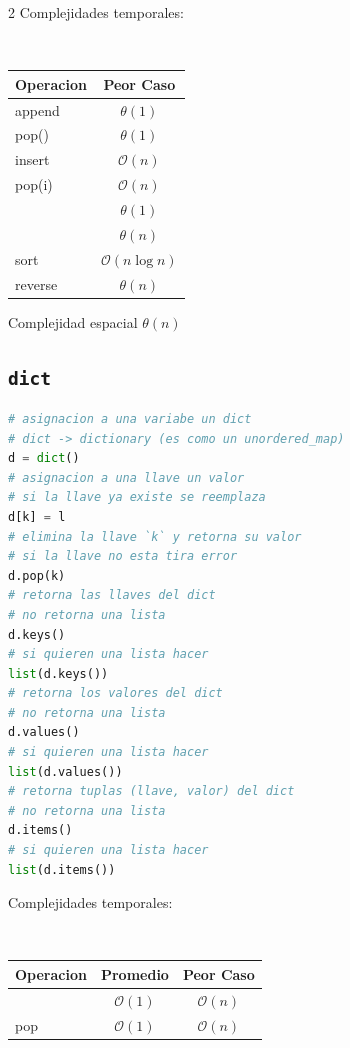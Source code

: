 \documentclass{article}
\newcommand{\bigO}{\mathcal{O}}
\begin{document}
\begin{multicols}{2}
Complejidades temporales:
\begin{table}[H]
  \tt \scriptsize
  \begin{center}
    \begin{tabular}[c]{l|c}
      \hline
      Operacion & Peor Caso \\
      \hline
      append & $\theta(1)$ \\
      \hline
      pop() & $\theta(1)$ \\
      \hline
      insert & $\bigO(n)$ \\
      \hline
      pop(i) & $\bigO(n)$ \\
      \hline
      [i] & $\theta(1)$\\
      \hline
      [i:j] & $\theta(n)$\\
      \hline
      sort & $\bigO(n \log n)$ \\
      \hline
      reverse & $\theta(n)$\\
    \end{tabular}
  \end{center}
\end{table}

Complejidad espacial $\theta(n)$

\subsection*{\tt \footnotesize dict}
\begin{lstlisting}[language=Python]
# asignacion a una variabe un dict
# dict -> dictionary (es como un unordered_map)
d = dict()
# asignacion a una llave un valor
# si la llave ya existe se reemplaza
d[k] = l 
# elimina la llave `k` y retorna su valor
# si la llave no esta tira error
d.pop(k)
# retorna las llaves del dict
# no retorna una lista
d.keys()
# si quieren una lista hacer
list(d.keys())
# retorna los valores del dict
# no retorna una lista
d.values()
# si quieren una lista hacer
list(d.values())
# retorna tuplas (llave, valor) del dict
# no retorna una lista
d.items()
# si quieren una lista hacer
list(d.items())
\end{lstlisting}

Complejidades temporales:
\begin{table}[H]
  \tt \scriptsize
  \begin{center}
    \begin{tabular}[c]{l|c|c}
      \hline
      Operacion & Promedio & Peor Caso\\
      \hline
      [k] & $\bigO(1)$ & $\bigO(n)$ \\
      \hline
      pop & $\bigO(1)$ & $\bigO(n)$\\
      \hline
    \end{tabular}
  \end{center}
\end{table}
\end{multicols}
\end{document}
